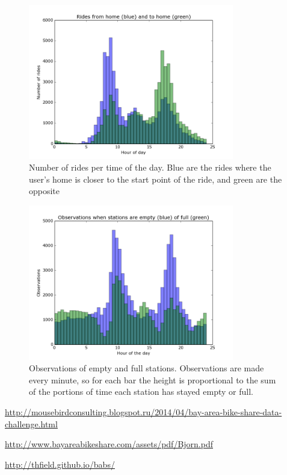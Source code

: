 \documentclass{article}
\begin{document}
\begin{figure}
	\centering
	\includegraphics[width=0.8\textwidth]{../rides_from_home_to_home.png}
	\caption{Number of rides per time of the day. Blue are the rides where the user's home is closer to the start point of the ride, and green are the opposite}
	\label{fig:ridestofromhome}
\end{figure}

\begin{figure}
	\centering
	\includegraphics[width=0.8\textwidth]{../empty_full_stations.png}
	\caption{Observations of empty and full stations. Observations are made every minute, so for each bar the height is proportional to the sum of the portions of time each station has stayed empty or full. }
	\label{fig:emptyfull}
\end{figure}




\begin{thebibliography}{9}

\url{http://mousebirdconsulting.blogspot.ru/2014/04/bay-area-bike-share-data-challenge.html}

\url{http://www.bayareabikeshare.com/assets/pdf/Bjorn.pdf}

\url{http://thfield.github.io/babs/}


\end{thebibliography}
\end{document}
